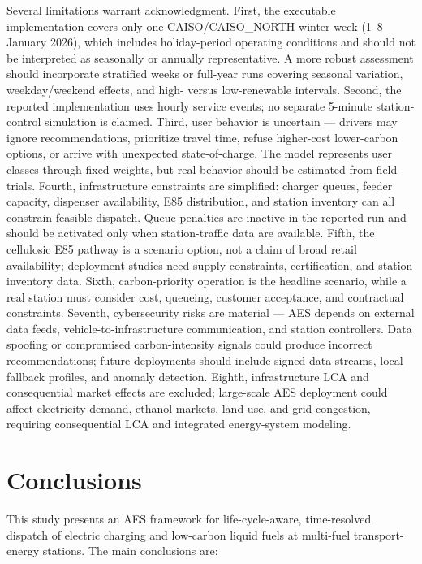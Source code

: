 \documentclass[cleantechnol,article,submit,pdftex,moreauthors]{Definitions/mdpi}
\begin{document}
Several limitations warrant acknowledgment. First, the executable implementation covers only one CAISO/CAISO\_NORTH winter week (1--8 January 2026), which includes holiday-period operating conditions and should not be interpreted as seasonally or annually representative. A more robust assessment should incorporate stratified weeks or full-year runs covering seasonal variation, weekday/weekend effects, and high- versus low-renewable intervals. Second, the reported implementation uses hourly service events; no separate 5-minute station-control simulation is claimed. Third, user behavior is uncertain --- drivers may ignore recommendations, prioritize travel time, refuse higher-cost lower-carbon options, or arrive with unexpected state-of-charge. The model represents user classes through fixed weights, but real behavior should be estimated from field trials. Fourth, infrastructure constraints are simplified: charger queues, feeder capacity, dispenser availability, E85 distribution, and station inventory can all constrain feasible dispatch. Queue penalties are inactive in the reported run and should be activated only when station-traffic data are available. Fifth, the cellulosic E85 pathway is a scenario option, not a claim of broad retail availability; deployment studies need supply constraints, certification, and station inventory data. Sixth, carbon-priority operation is the headline scenario, while a real station must consider cost, queueing, customer acceptance, and contractual constraints. Seventh, cybersecurity risks are material --- AES depends on external data feeds, vehicle-to-infrastructure communication, and station controllers. Data spoofing or compromised carbon-intensity signals could produce incorrect recommendations; future deployments should include signed data streams, local fallback profiles, and anomaly detection. Eighth, infrastructure LCA and consequential market effects are excluded; large-scale AES deployment could affect electricity demand, ethanol markets, land use, and grid congestion, requiring consequential LCA and integrated energy-system modeling.


\section{Conclusions}
\label{sec:conclusions}

This study presents an AES framework for life-cycle-aware, time-resolved dispatch of electric charging and low-carbon liquid fuels at multi-fuel transport-energy stations. The main conclusions are:
\end{document}
